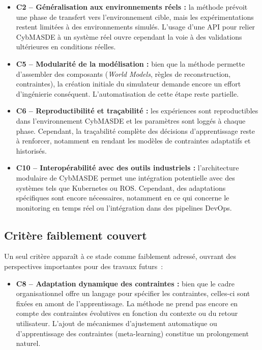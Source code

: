 \begin{itemize}
    \item \textbf{C2 – Généralisation aux environnements réels :} la méthode prévoit une phase de transfert vers l’environnement cible, mais les expérimentations restent limitées à des environnements simulés. L’usage d’une API pour relier CybMASDE à un système réel ouvre cependant la voie à des validations ultérieures en conditions réelles.

    \item \textbf{C5 – Modularité de la modélisation :} bien que la méthode permette d’assembler des composants (\textit{World Models}, règles de reconstruction, contraintes), la création initiale du simulateur demande encore un effort d’ingénierie conséquent. L’automatisation de cette étape reste partielle.

    \item \textbf{C6 – Reproductibilité et traçabilité :} les expériences sont reproductibles dans l’environnement CybMASDE et les paramètres sont loggés à chaque phase. Cependant, la traçabilité complète des décisions d’apprentissage reste à renforcer, notamment en rendant les modèles de contraintes adaptatifs et historisés.

    \item \textbf{C10 – Interopérabilité avec des outils industriels :} l’architecture modulaire de CybMASDE permet une intégration potentielle avec des systèmes tels que Kubernetes ou ROS. Cependant, des adaptations spécifiques sont encore nécessaires, notamment en ce qui concerne le monitoring en temps réel ou l’intégration dans des pipelines DevOps.
\end{itemize}

\subsection*{Critère faiblement couvert}

Un seul critère apparaît à ce stade comme faiblement adressé, ouvrant des perspectives importantes pour des travaux futurs~:

\begin{itemize}
    \item \textbf{C8 – Adaptation dynamique des contraintes :} bien que le cadre organisationnel offre un langage pour spécifier les contraintes, celles-ci sont fixées en amont de l’apprentissage. La méthode ne prend pas encore en compte des contraintes évolutives en fonction du contexte ou du retour utilisateur. L’ajout de mécanismes d’ajustement automatique ou d’apprentissage des contraintes (meta-learning) constitue un prolongement naturel.
\end{itemize}


